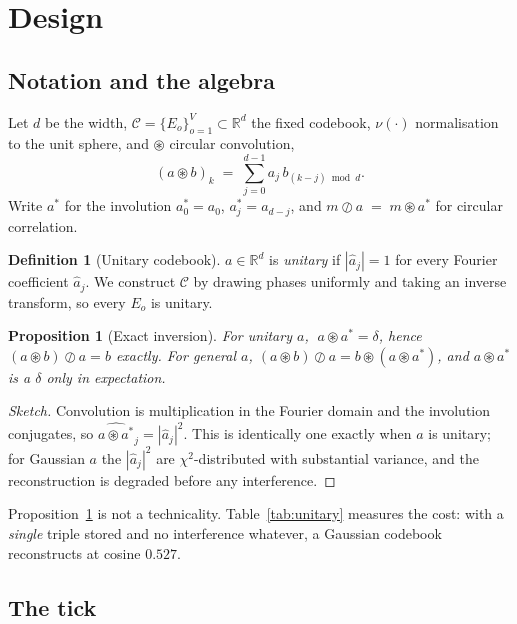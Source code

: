 \documentclass[11pt,a4paper]{article}
\newcommand{\bind}{\mathbin{\circledast}}
\newcommand{\unbind}{\mathbin{\oslash}}
\newcommand{\CB}{\mathcal{C}}
\theoremstyle{plain}
\newtheorem{proposition}{Proposition}
\theoremstyle{definition}
\newtheorem{definition}{Definition}
\theoremstyle{remark}
\begin{document}
\section{Design}
\label{sec:design}

\subsection{Notation and the algebra}

Let $d$ be the width, $\CB=\{E_o\}_{o=1}^{V}\subset\mathbb{R}^d$ the fixed
codebook, $\nu(\cdot)$ normalisation to the unit sphere, and $\bind$ circular
convolution,
\begin{equation}
(a\bind b)_k \;=\; \sum_{j=0}^{d-1} a_j\, b_{(k-j)\bmod d}.
\end{equation}
Write $a^{*}$ for the involution $a^{*}_0=a_0$, $a^{*}_j=a_{d-j}$, and
$m \unbind a \;=\; m \bind a^{*}$ for circular correlation.

\begin{definition}[Unitary codebook]
$a\in\mathbb{R}^d$ is \emph{unitary} if $|\hat a_j|=1$ for every Fourier
coefficient $\hat a_j$. We construct $\CB$ by drawing phases uniformly and
taking an inverse transform, so every $E_o$ is unitary.
\end{definition}

\begin{proposition}[Exact inversion]
\label{prop:inverse}
For unitary $a$, $\;a\bind a^{*}=\delta$, hence $(a\bind b)\unbind a=b$ exactly.
For general $a$, $(a\bind b)\unbind a = b\bind(a\bind a^{*})$, and $a\bind a^{*}$
is a $\delta$ only in expectation.
\end{proposition}

\begin{proof}[Sketch]
Convolution is multiplication in the Fourier domain and the involution conjugates,
so $\widehat{a\bind a^{*}}_j=|\hat a_j|^2$. This is identically one exactly when
$a$ is unitary; for Gaussian $a$ the $|\hat a_j|^2$ are $\chi^2$-distributed with
substantial variance, and the reconstruction is degraded before any interference.
\end{proof}

Proposition~\ref{prop:inverse} is not a technicality. Table~\ref{tab:unitary}
measures the cost: with a \emph{single} triple stored and no interference
whatever, a Gaussian codebook reconstructs at cosine $0.527$.

\subsection{The tick}
\end{document}
